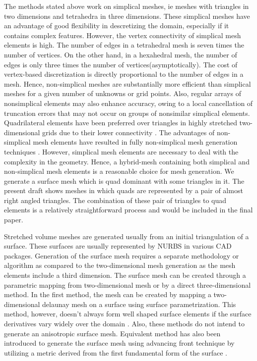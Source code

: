 \documentclass[conf]{new-aiaa}
\begin{document}
The methods stated above work on simplical meshes, ie meshes with triangles in two dimensions and tetrahedra in three dimensions. These simplical meshes have an advantage of good flexibility in descretizing the domain, especially if it contains complex features. However, the vertex connectivity of simplical mesh elements is high. The number of edges in a tetrahedral mesh is seven times the number of vertices. On the other hand, in a hexahedral mesh, the number of edges is only three times the number of vertices(asymptotically). The cost of vertex-based discretization is directly proportional to the number of edges in a mesh. Hence, non-simplical meshes are substantially more efficient than simplical meshes for a given number of unknowns or grid points. Also, regular arrays of nonsimplical elements may also enhance accuracy, owing to a local cancellation of truncation errors that may not occur on groups of nonsimilar simplical elements\cite{mavriplis1997unstructured}. Quadrilateral elements have been preferred over triangles in highly stretched two-dimensional grids due to their lower connectivity \cite{aftosmis1994accuracy}. The advantages of non-simplical mesh elements have resulted in fully non-simplical mesh generation techniques \cite{blacker1991paving, zhu1991new}. However, simplical mesh elements are necessary to deal with the complexity in the geometry. Hence, a hybrid-mesh containing both simplical and non-simplical mesh elements is a reasonable choice for mesh generation. We generate a surface mesh which is quad dominant with some triangles in it. The present draft shows meshes in which quads are represented by a pair of almost right angled triangles. The combination of these pair of triangles to quad elements is a relatively straightforward process and would be included in the final paper.

Stretched volume meshes are generated usually from an initial triangulation of a surface. These surfaces are usually represented by NURBS in various CAD packages. Generation of the surface mesh requires a separate methodology or algorithm as compared to the two-dimensional mesh generation as the mesh elements include a third dimension. The surface mesh can be created through a parametric mapping from two-dimensional mesh or by a direct three-dimensional method. In the first method, the mesh can be created by mapping a two-dimensional delaunay mesh on a surface\cite{george1998delaunay, chen1997delaunay} using surface parametrization. This method, however, doesn't always form well shaped surface elements if the surface derivatives vary widely over the domain \cite{owen1998survey}. Also, these methods do not intend to generate an anisotropic surface mesh. Equivalent method has also been introduced to generate the surface mesh using advancing front technique by utilizing a metric derived from the first fundamental form of the surface \cite{cuilliere1998adaptive, tristano1998advancing}.
\end{document}
